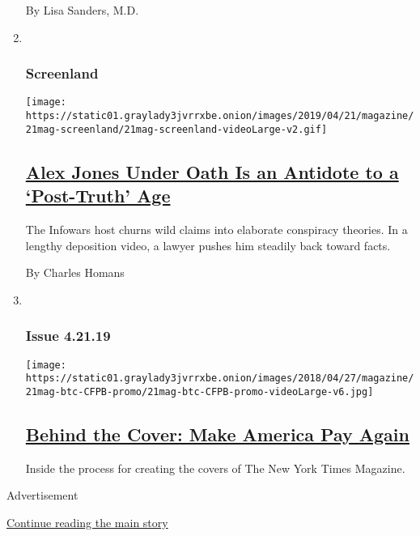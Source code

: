 \begin{enumerate}
  By Lisa Sanders, M.D.
\item ~
  \hypertarget{screenland}{%
  \subsubsection{Screenland}\label{screenland}}

  \texttt{[image: https://static01.graylady3jvrrxbe.onion/images/2019/04/21/magazine/21mag-screenland/21mag-screenland-videoLarge-v2.gif]}

  \hypertarget{alex-jones-under-oath-is-an-antidote-to-a-post-truth-age}{%
  \subsection{\texorpdfstring{\href{/2019/04/17/magazine/watch-alex-jones-called-to-account-over-sandy-hook-under-oath.html}{Alex
  Jones Under Oath Is an Antidote to a `Post-Truth'
  Age}}{Alex Jones Under Oath Is an Antidote to a `Post-Truth' Age}}\label{alex-jones-under-oath-is-an-antidote-to-a-post-truth-age}}

  The Infowars host churns wild claims into elaborate conspiracy
  theories. In a lengthy deposition video, a lawyer pushes him steadily
  back toward facts.

  By Charles Homans
\item ~
  \hypertarget{issue-42119}{%
  \subsubsection{Issue 4.21.19}\label{issue-42119}}

  \texttt{[image: https://static01.graylady3jvrrxbe.onion/images/2018/04/27/magazine/21mag-btc-CFPB-promo/21mag-btc-CFPB-promo-videoLarge-v6.jpg]}

  \hypertarget{behind-the-cover-make-america-pay-again}{%
  \subsection{\texorpdfstring{\href{/2019/04/17/magazine/behind-the-cover-make-america-pay-again.html}{Behind
  the Cover: Make America Pay
  Again}}{Behind the Cover: Make America Pay Again}}\label{behind-the-cover-make-america-pay-again}}

  Inside the process for creating the covers of The New York Times
  Magazine.
\end{enumerate}

Advertisement

\protect\hyperlink{after-mid1}{Continue reading the main story}


